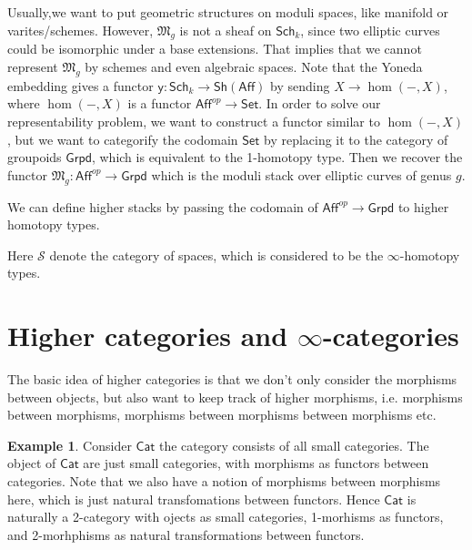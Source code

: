 \documentclass[11pt]{amsart}
\numberwithin{equation}{section}
\theoremstyle{definition}
\newtheorem{example}[thm]{Example}
\theoremstyle{remark}
\numberwithin{equation}{section}
\newcommand{\M}{{\mathfrak{M}}}
\newcommand{\Sp}{{\mathscr{S}}}
\newcommand{\y}{\mathsf{y}}
\newcommand{\sh}{\mathsf{Sh}}
\newcommand{\set}{\mathsf{Set}}
\newcommand{\sch}{\mathsf{Sch}}
\newcommand{\gpd}{\mathsf{Grpd}}
\newcommand{\cat}{\mathsf{Cat}}
\newcommand{\aff}{\mathsf{Aff}}
\begin{document}
Usually,we want to put geometric structures on moduli spaces, like manifold or varites/schemes. However, $\M_g$ is not a sheaf on $\sch_k$, since two elliptic curves could be isomorphic under a base extensions. That implies that we cannot represent $\M_g$ by schemes and even algebraic spaces. Note that the Yoneda embedding gives a functor $\y: \sch_k \to   \sh(\aff)$ by sending $X \to \hom (-, X)$, where $\hom(-,X)$ is a functor $\aff^{op}\to \set$. In order to solve our representability problem, we want to construct a functor similar to $\hom (-, X)$, but we want to categorify the codomain $\set$ by replacing it to the category of groupoids $\gpd$, which is equivalent to the 1-homotopy type. Then we recover the functor $\M_g:\aff^{op} \to \gpd$ which is the moduli stack over elliptic curves of genus $g$. 

We can define higher stacks by passing the codomain of $\aff^{op} \to \gpd$ to higher homotopy types. 
\begin{center}
\end{center}
Here $\mathscr{S}$ denote the category of spaces, which is considered to be the $\infty$-homotopy types.



\section{Higher categories and $\infty$-categories}

The basic idea of higher categories is that we don't only consider the morphisms between objects, but also want to keep track of higher morphisms, i.e. morphisms between morphisms, morphisms between morphisms between morphisms etc. 

\begin{example}
	Consider $\cat$ the category consists of all small categories. The object of $\cat$ are just small categories, with morphisms as functors between categories. Note that we also have a notion of morphisms between morphisms here, which is just natural transfomations between functors. Hence $\cat$ is naturally a 2-category with ojects as small categories, 1-morhisms as functors, and 2-morhphisms as natural transformations between functors. 
\end{example}
\end{document}
